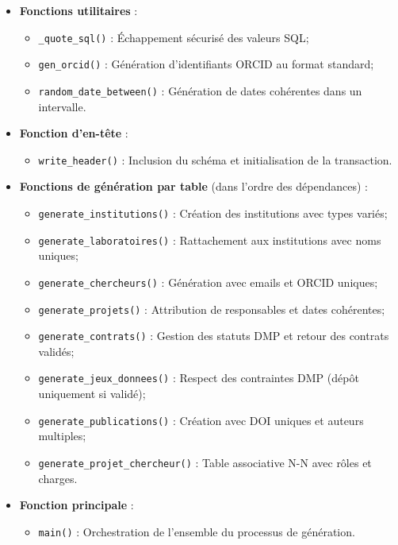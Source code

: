 \documentclass[12pt,a4paper]{article}
\begin{document}
\begin{itemize}
    \item \textbf{Fonctions utilitaires} :
    \begin{itemize}
        \item \texttt{\_quote\_sql()} : Échappement sécurisé des valeurs SQL;
        \item \texttt{gen\_orcid()} : Génération d'identifiants ORCID au format standard;
        \item \texttt{random\_date\_between()} : Génération de dates cohérentes dans un intervalle.
    \end{itemize}
    
    \item \textbf{Fonction d'en-tête} :
    \begin{itemize}
        \item \texttt{write\_header()} : Inclusion du schéma et initialisation de la transaction.
    \end{itemize}
    
    \item \textbf{Fonctions de génération par table} (dans l'ordre des dépendances) :
    \begin{itemize}
        \item \texttt{generate\_institutions()} : Création des institutions avec types variés;
        \item \texttt{generate\_laboratoires()} : Rattachement aux institutions avec noms uniques;
        \item \texttt{generate\_chercheurs()} : Génération avec emails et ORCID uniques;
        \item \texttt{generate\_projets()} : Attribution de responsables et dates cohérentes;
        \item \texttt{generate\_contrats()} : Gestion des statuts DMP et retour des contrats validés;
        \item \texttt{generate\_jeux\_donnees()} : Respect des contraintes DMP (dépôt uniquement si validé);
        \item \texttt{generate\_publications()} : Création avec DOI uniques et auteurs multiples;
        \item \texttt{generate\_projet\_chercheur()} : Table associative N-N avec rôles et charges.
    \end{itemize}
    
    \item \textbf{Fonction principale} :
    \begin{itemize}
        \item \texttt{main()} : Orchestration de l'ensemble du processus de génération.
    \end{itemize}
\end{itemize}
\end{document}
